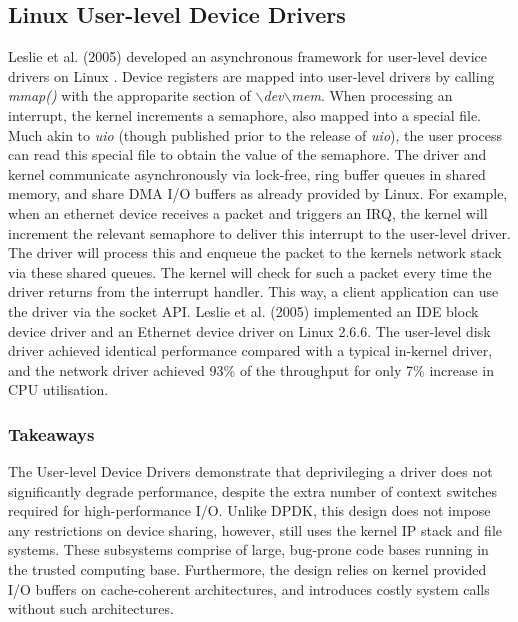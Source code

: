 \subsection{Linux User-level Device Drivers}\label{user_level_dd}
Leslie et al. (2005) developed an asynchronous framework for user-level device drivers on Linux \cite{Leslie_CFGGMPSEH_05}. 
Device registers are mapped into user-level drivers by calling \emph{mmap()} with the approparite section of \emph{$\backslash$dev$\backslash$mem}. 
When processing an interrupt, the kernel increments a semaphore, also mapped into a special file. Much akin to \emph{uio} 
(though published prior to the release of \emph{uio}), the user process can read this special file to obtain the value of the semaphore. 
The driver and kernel communicate
asynchronously via lock-free, ring buffer queues in shared memory, and share DMA I/O buffers as already provided by Linux. 
For example, when an ethernet device receives a packet 
and triggers an IRQ, the kernel will increment the relevant semaphore to deliver this interrupt to the user-level driver. 
The driver will process this and enqueue the packet to the kernels network stack via these shared queues. The kernel will
check for such a packet every time the driver returns from the interrupt handler. This way, a client application
can use the driver via the socket API. Leslie et al. (2005) implemented an IDE block device driver and an Ethernet device driver
on Linux 2.6.6. The user-level disk driver achieved identical performance compared with a typical in-kernel driver, and the 
network driver achieved 93\% of the throughput for only 7\% increase in CPU utilisation. 

\subsubsection{Takeaways}
The User-level Device Drivers demonstrate that deprivileging a driver does not significantly degrade performance, despite the extra
number of context switches required for high-performance I/O. Unlike DPDK, this design does not impose any restrictions on device sharing,
however, still uses the kernel IP stack and file systems. These subsystems comprise of large, bug-prone code bases running in the trusted computing base.
Furthermore, the design relies on kernel provided I/O buffers on cache-coherent architectures, and introduces costly system calls without such
architectures.

